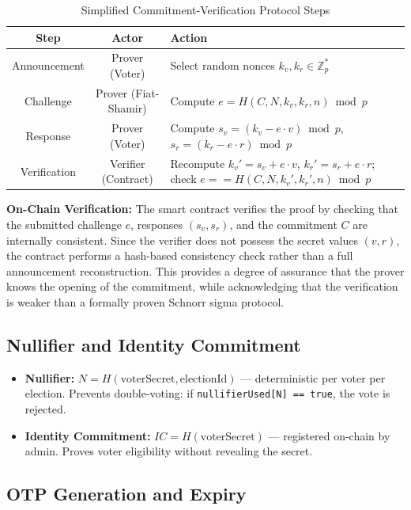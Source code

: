 \documentclass[oneside,a4paper,12pt]{book}
\begin{document}
\begin{table}[htbp]
\centering
\renewcommand{\arraystretch}{1.3}
\small
\begin{tabularx}{\textwidth}{|c|c|X|}
\hline
\textbf{Step} & \textbf{Actor} & \textbf{Action} \\
\hline
Announcement & Prover (Voter) & Select random nonces $k_v, k_r \in \mathbb{Z}_p^*$ \\
\hline
Challenge & Prover (Fiat-Shamir) & Compute $e = H(C, N, k_v, k_r, n) \bmod p$ \\
\hline
Response & Prover (Voter) & Compute $s_v = (k_v - e \cdot v) \bmod p$, $s_r = (k_r - e \cdot r) \bmod p$ \\
\hline
Verification & Verifier (Contract) & Recompute $k_v' = s_v + e \cdot v$, $k_r' = s_r + e \cdot r$; check $e == H(C, N, k_v', k_r', n) \bmod p$ \\
\hline
\end{tabularx}
\caption{Simplified Commitment-Verification Protocol Steps}
\label{tab:schnorr}
\end{table}

\textbf{On-Chain Verification:} The smart contract verifies the proof by checking that the submitted challenge $e$, responses $(s_v, s_r)$, and the commitment $C$ are internally consistent. Since the verifier does not possess the secret values $(v, r)$, the contract performs a hash-based consistency check rather than a full announcement reconstruction. This provides a degree of assurance that the prover knows the opening of the commitment, while acknowledging that the verification is weaker than a formally proven Schnorr sigma protocol.

\subsection{Nullifier and Identity Commitment}
\begin{itemize}[leftmargin=1.5cm]
    \item \textbf{Nullifier:} $N = H(\text{voterSecret}, \text{electionId})$ --- deterministic per voter per election. Prevents double-voting: if \texttt{nullifierUsed[N] == true}, the vote is rejected.
    \item \textbf{Identity Commitment:} $IC = H(\text{voterSecret})$ --- registered on-chain by admin. Proves voter eligibility without revealing the secret.
\end{itemize}

\subsection{OTP Generation and Expiry}
\end{document}

